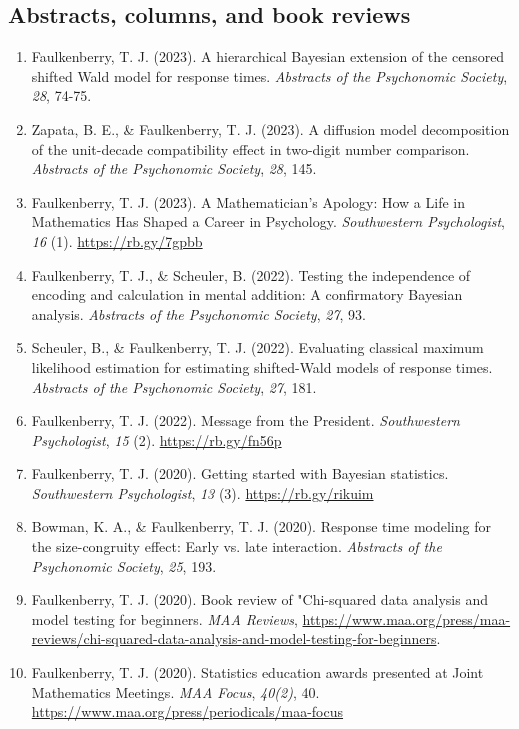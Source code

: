 \documentclass[article,10pt]{article}
\begin{document}
\subsection*{Abstracts, columns, and book reviews}
\label{sec:org1a93f0e}
\begin{enumerate}
\item Faulkenberry, T. J. (2023). A hierarchical Bayesian extension of the censored shifted Wald model for response times. \emph{Abstracts of the Psychonomic Society}, \emph{28}, 74-75.
\item Zapata, B. E., \& Faulkenberry, T. J. (2023). A diffusion model decomposition of the unit-decade compatibility effect in two-digit number comparison. \emph{Abstracts of the Psychonomic Society}, \emph{28}, 145.
\item Faulkenberry, T. J. (2023). A Mathematician's Apology: How a Life in Mathematics Has Shaped a Career in Psychology. \emph{Southwestern Psychologist}, \emph{16} (1). \url{https://rb.gy/7gpbb}
\item Faulkenberry, T. J., \& Scheuler, B. (2022). Testing the independence of encoding and calculation in mental addition: A confirmatory Bayesian analysis. \emph{Abstracts of the Psychonomic Society}, \emph{27}, 93.
\item Scheuler, B., \& Faulkenberry, T. J. (2022). Evaluating classical maximum likelihood estimation for estimating shifted-Wald models of response times. \emph{Abstracts of the Psychonomic Society}, \emph{27}, 181.
\item Faulkenberry, T. J. (2022). Message from the President. \emph{Southwestern Psychologist}, \emph{15} (2). \url{https://rb.gy/fn56p}
\item Faulkenberry, T. J. (2020). Getting started with Bayesian statistics. \emph{Southwestern Psychologist}, \emph{13} (3). \url{https://rb.gy/rikuim}
\item Bowman, K. A., \& Faulkenberry, T. J. (2020). Response time modeling for the size-congruity effect: Early vs. late interaction. \emph{Abstracts of the Psychonomic Society}, \emph{25}, 193.
\item Faulkenberry, T. J. (2020). Book review of "Chi-squared data analysis and model testing for beginners. \emph{MAA Reviews}, \url{https://www.maa.org/press/maa-reviews/chi-squared-data-analysis-and-model-testing-for-beginners}.
\item Faulkenberry, T. J. (2020). Statistics education awards presented at Joint Mathematics Meetings. \emph{MAA Focus}, \emph{40(2)}, 40. \url{https://www.maa.org/press/periodicals/maa-focus}

\end{enumerate}
\end{document}
